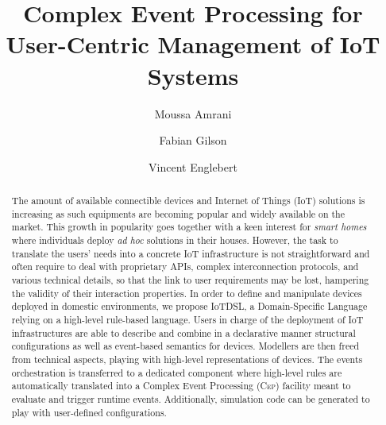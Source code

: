 \documentclass[runningheads,a4paper]{llncs}
\newcommand{\IOT}{IoT\xspace}
\newcommand{\IOTDSL}{\textsf{IoTD\scriptsize\MakeUppercase{sl}}\xspace}
\newcommand{\CEP}{\textsc{Cep}\xspace}
\begin{document}
\renewcommand{\thelstlisting}{\arabic{lstlisting}}

\title{Complex Event Processing for User-Centric Management of IoT Systems}
\author{Moussa Amrani \and Fabian Gilson \and Vincent Englebert}


\maketitle 

\begin{abstract}
	The amount of available connectible devices and Internet of Things (\IOT) solutions is increasing as such equipments are becoming popular and widely available on the market. This growth in popularity goes together with a keen interest for \textit{smart homes} where individuals deploy \textit{ad hoc} solutions in their houses. However, the task to translate the users' needs into a concrete \IOT infrastructure is not straightforward and often require to deal with proprietary APIs, complex interconnection protocols, and various technical details, so that the link to user requirements may be lost, hampering the validity of their interaction properties. In order to define and manipulate devices deployed in domestic environments, we propose \IOTDSL, a Domain-Specific Language relying on a high-level rule-based language. Users in charge of the deployment of \IOT infrastructures are able to describe and combine in a declarative manner structural configurations as well as event-based semantics for devices. Modellers are then freed from technical aspects, playing with high-level representations of devices. The events orchestration is transferred to a dedicated component where high-level rules are automatically translated into a Complex Event Processing (\CEP) facility meant to evaluate and trigger runtime events. Additionally, simulation code can be generated to play with user-defined configurations.
\end{abstract}











\end{document}
